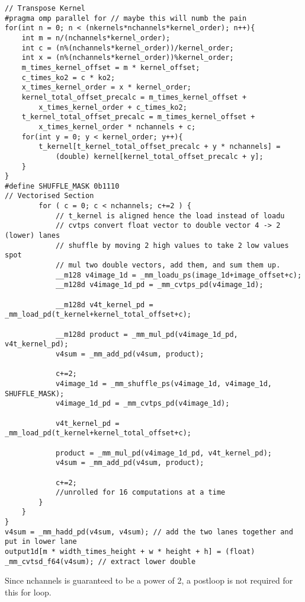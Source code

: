 \documentclass[12pt,fleqn,leqno,letterpaper]{article}
\begin{document}
\begin{verbatim}
// Transpose Kernel
#pragma omp parallel for // maybe this will numb the pain
for(int n = 0; n < (nkernels*nchannels*kernel_order); n++){
    int m = n/(nchannels*kernel_order);
    int c = (n%(nchannels*kernel_order))/kernel_order; 
    int x = (n%(nchannels*kernel_order))%kernel_order; 
    m_times_kernel_offset = m * kernel_offset;
    c_times_ko2 = c * ko2;
    x_times_kernel_order = x * kernel_order;
    kernel_total_offset_precalc = m_times_kernel_offset + 
        x_times_kernel_order + c_times_ko2;
    t_kernel_total_offset_precalc = m_times_kernel_offset + 
        x_times_kernel_order * nchannels + c;
    for(int y = 0; y < kernel_order; y++){
        t_kernel[t_kernel_total_offset_precalc + y * nchannels] = 
            (double) kernel[kernel_total_offset_precalc + y];
    }
}
#define SHUFFLE_MASK 0b1110
// Vectorised Section
        for ( c = 0; c < nchannels; c+=2 ) {
            // t_kernel is aligned hence the load instead of loadu
            // cvtps convert float vector to double vector 4 -> 2 (lower) lanes
            // shuffle by moving 2 high values to take 2 low values spot
            // mul two double vectors, add them, and sum them up.
            __m128 v4image_1d = _mm_loadu_ps(image_1d+image_offset+c);
            __m128d v4image_1d_pd = _mm_cvtps_pd(v4image_1d);

            __m128d v4t_kernel_pd = _mm_load_pd(t_kernel+kernel_total_offset+c);

            __m128d product = _mm_mul_pd(v4image_1d_pd, v4t_kernel_pd);
            v4sum = _mm_add_pd(v4sum, product);

            c+=2;
            v4image_1d = _mm_shuffle_ps(v4image_1d, v4image_1d, SHUFFLE_MASK);
            v4image_1d_pd = _mm_cvtps_pd(v4image_1d);

            v4t_kernel_pd = _mm_load_pd(t_kernel+kernel_total_offset+c);

            product = _mm_mul_pd(v4image_1d_pd, v4t_kernel_pd);
            v4sum = _mm_add_pd(v4sum, product);

            c+=2;
            //unrolled for 16 computations at a time 
        }
    }
}
v4sum = _mm_hadd_pd(v4sum, v4sum); // add the two lanes together and put in lower lane
output1d[m * width_times_height + w * height + h] = (float) _mm_cvtsd_f64(v4sum); // extract lower double 
\end{verbatim}
Since nchannels is guaranteed to be a power of 2, a postloop is not required for this for loop.
\end{document}
